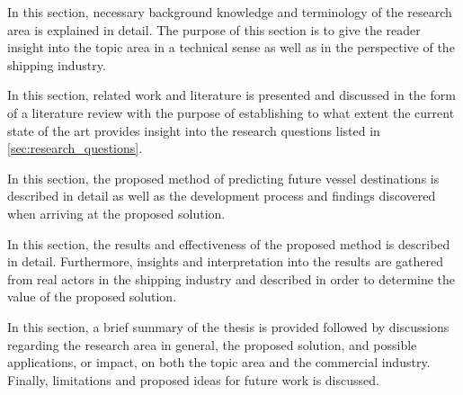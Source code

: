 
In this section, necessary background knowledge and terminology of the research area is explained in detail. The purpose of this section is to give the reader insight into the topic area in a technical sense as well as in the perspective of the shipping industry.


In this section, related work and literature is presented and discussed in the form of a literature review with the purpose of establishing to what extent the current state of the art provides insight into the research questions listed in \cref{sec:research_questions}.


In this section, the proposed method of predicting future vessel destinations is described in detail as well as the development process and findings discovered when arriving at the proposed solution.


In this section, the results and effectiveness of the proposed method is described in detail. Furthermore, insights and interpretation into the results are gathered from real actors in the shipping industry and described in order to determine the value of the proposed solution.


In this section, a brief summary of the thesis is provided followed by discussions regarding the research area in general, the proposed solution, and possible applications, or impact, on both the topic area and the commercial industry. Finally, limitations and proposed ideas for future work is discussed.
